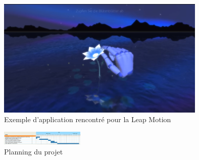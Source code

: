 \begin{figure}
  \begin{center}
    \includegraphics[width=10cm]{images/exampleHand.png}
    \caption{Exemple d'application rencontré pour la Leap Motion}
    \label{fig:example}
  \end{center}
\end{figure}

\begin{figure}
  \begin{center}
    \includegraphics[angle=-90, width=4cm]{images/planning.png}
    \caption{Planning du projet}
    \label{fig:planning}
  \end{center}
\end{figure}
